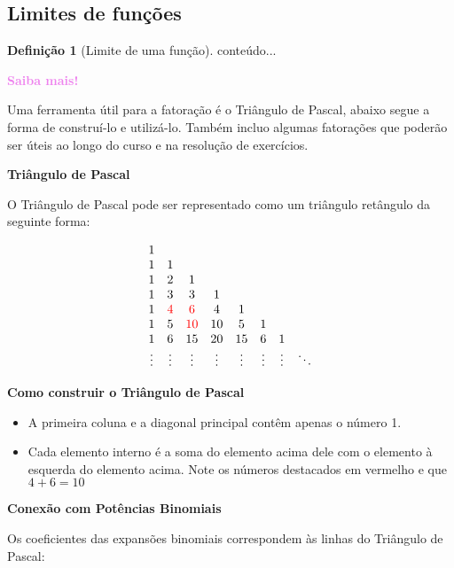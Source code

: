 \documentclass[12pt,openright,twoside,a4paper]{article}
\theoremstyle{definition}
\newtheorem{definition}{Definição}[section]
\begin{document}
	\subsection{Limites de funções}
	
	\begin{definition}[Limite de uma função]
		conteúdo...
	\end{definition}
	
	\begin{snugshade}
		\textbf{\textcolor{violet}{Saiba mais!}}
		
		Uma ferramenta útil para a fatoração é o Triângulo de Pascal, abaixo segue a forma de construí-lo e utilizá-lo. Também incluo algumas fatorações que poderão ser úteis ao longo do curso e na resolução de exercícios.
		
		\textbf{\large{Triângulo de Pascal}}
		
		O Triângulo de Pascal pode ser representado como um triângulo retângulo da seguinte forma:
		
		\[
		\begin{array}{cccccccc}
			1 &   &   &   &   &   &   & \\
			1 & 1 &   &   &   &   &   & \\
			1 & 2 & 1 &   &   &   &   & \\
			1 & 3 & 3 & 1 &   &   &   & \\
			1 & \textcolor{red}{4} & \textcolor{red}{6} & 4 & 1 &   &   & \\
			1 & 5 & \textcolor{red}{10} & 10 & 5 & 1 &   & \\
			1 & 6 & 15 & 20 & 15 & 6 & 1 & \\
			\vdots & \vdots & \vdots & \vdots & \vdots & \vdots & \vdots & \ddots \\
		\end{array}
		\]
		
		\textbf{Como construir o Triângulo de Pascal}
		
		\begin{itemize}
			\item A primeira coluna e a diagonal principal contêm apenas o número 1.
			\item Cada elemento interno é a soma do elemento acima dele com o elemento à esquerda do elemento acima. Note os números destacados em vermelho e que $4 + 6 = 10$
		\end{itemize}
		
		\textbf{\large{Conexão com Potências Binomiais}}
		
		Os coeficientes das expansões binomiais correspondem às linhas do Triângulo de Pascal:
		

\end{snugshade}
\end{document}

